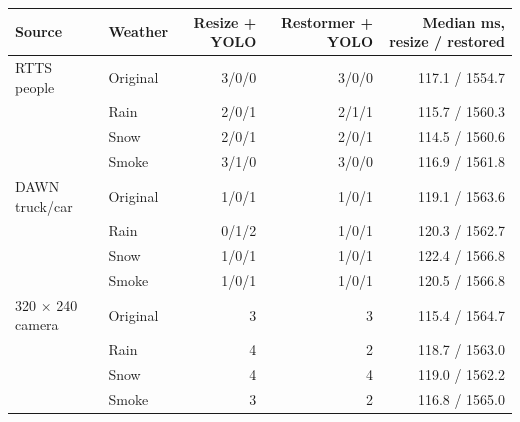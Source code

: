 \noindent\begin{minipage}{\linewidth}
\centering\small\renewcommand{\arraystretch}{1.12}\setlength{\tabcolsep}{3.5pt}
\label{tab:fixed-diagnostics}
\begin{tabular}{@{}llrrr@{}}\toprule
Source & Weather & Resize + YOLO & Restormer + YOLO & Median ms, resize / restored\\
\midrule
RTTS people & Original & 3/0/0 & 3/0/0 & 117.1 / 1554.7\\
 & Rain & 2/0/1 & 2/1/1 & 115.7 / 1560.3\\
 & Snow & 2/0/1 & 2/0/1 & 114.5 / 1560.6\\
 & Smoke & 3/1/0 & 3/0/0 & 116.9 / 1561.8\\
\midrule
DAWN truck/car & Original & 1/0/1 & 1/0/1 & 119.1 / 1563.6\\
 & Rain & 0/1/2 & 1/0/1 & 120.3 / 1562.7\\
 & Snow & 1/0/1 & 1/0/1 & 122.4 / 1566.8\\
 & Smoke & 1/0/1 & 1/0/1 & 120.5 / 1566.8\\
\midrule
320 × 240 camera & Original & 3 & 3 & 115.4 / 1564.7\\
 & Rain & 4 & 2 & 118.7 / 1563.0\\
 & Snow & 4 & 4 & 119.0 / 1562.2\\
 & Smoke & 3 & 2 & 116.8 / 1565.0\\
\bottomrule
\end{tabular}
\end{minipage}\par
